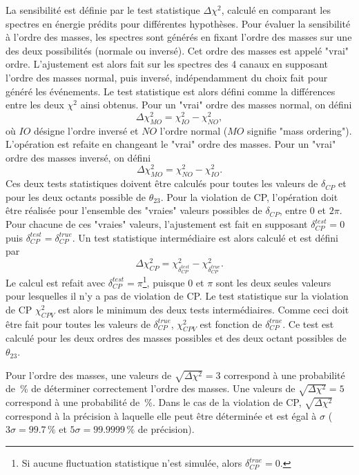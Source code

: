         La sensibilité est définie par le test statistique $\Delta \chi^2$, calculé en comparant les spectres en énergie prédits pour différentes hypothèses. Pour évaluer la sensibilité à l'ordre des masses, les spectres sont générés en fixant l'ordre des masses sur une des deux possibilités (normale ou inversé). Cet ordre des masses est appelé "vrai" ordre. L'ajustement est alors fait sur les spectres des 4 canaux en supposant l'ordre des masses normal, puis inversé, indépendamment du choix fait pour généré les événements. Le test statistique est alors défini comme la différences entre les deux $\chi^2$ ainsi obtenus. Pour un "vrai" ordre des masses normal, on défini
        $$\Delta \chi^2_{MO}=\chi^2_{IO}-\chi^2_{NO},$$
        où $IO$ désigne l'ordre inversé et $NO$ l'ordre normal ($MO$ signifie "mass ordering"). L'opération est refaite en changeant le "vrai" ordre des masses. Pour un "vrai" ordre des masses inversé, on défini
        $$\Delta \chi^2_{MO}=\chi^2_{NO}-\chi^2_{IO}.$$
        Ces deux tests statistiques doivent être calculés pour toutes les valeurs de $\delta_{CP}$ et pour les deux octants possible de $\theta_{23}$. Pour la violation de CP, l'opération doit être réalisée pour l'ensemble des "vraies" valeurs possibles de $\delta_{CP}$, entre $0$ et $2\pi$. Pour chacune de ces "vraies" valeurs, l'ajustement est fait en supposant $\delta_{CP}^{test}=0$ puis $\delta_{CP}^{test}=\delta_{CP}^{true}$. Un test statistique intermédiaire est alors calculé et est défini par
        $$\Delta \chi^2_{CP}=\chi^2_{\delta_{CP}^{test}}-\chi^2_{\delta_{CP}^{true}}.$$
        Le calcul est refait avec $\delta_{CP}^{test}=\pi$\footnote{Si aucune fluctuation statistique n'est simulée, alors $\delta_{CP}^{true}=0$.}, puisque $0$ et $\pi$ sont les deux seules valeurs pour lesquelles il n'y a pas de violation de CP. Le test statistique sur la violation de CP $\chi^2_{CPV}$ est alors le minimum des deux tests intermédiaires. Comme ceci doit être fait pour toutes les valeurs de $\delta_{CP}^{true}$, $\chi^2_{CPV}$ est fonction de $\delta_{CP}^{true}$. Ce test est calculé pour les deux ordres des masses possibles et des deux octant possibles de $\theta_{23}$.%
        
        Pour l'ordre des masses, une valeurs de $\sqrt{\Delta \chi^2}=3$ correspond à une probabilité de \,\%
        de déterminer correctement l'ordre des masses. Une valeurs de $\sqrt{\Delta \chi^2}=5$ correspond à une probabilité de \,\%\cite{Collaboration2015}. Dans le cas de la violation de CP, $\sqrt{\Delta \chi^2}$ correspond à la précision à laquelle elle peut être déterminée et est égal à $\sigma$ ($3\sigma = 99.7\,\%$ et  $5\sigma = 99.9999\,\%$ de précision).
        
